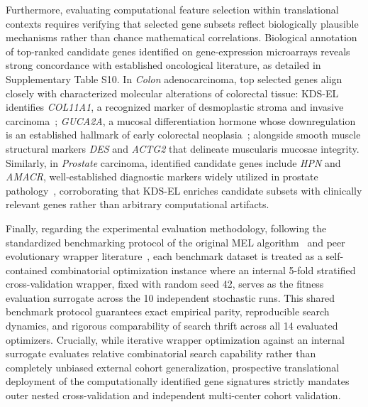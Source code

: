 Furthermore, evaluating computational feature selection within translational contexts requires verifying that selected gene subsets reflect biologically plausible mechanisms rather than chance mathematical correlations. Biological annotation of top-ranked candidate genes identified on gene-expression microarrays reveals strong concordance with established oncological literature, as detailed in Supplementary Table S10. In \textit{Colon} adenocarcinoma, top selected genes align closely with characterized molecular alterations of colorectal tissue: KDS-EL identifies \textit{COL11A1}, a recognized marker of desmoplastic stroma and invasive carcinoma~\cite{fischer2001}; \textit{GUCA2A}, a mucosal differentiation hormone whose downregulation is an established hallmark of early colorectal neoplasia~\cite{alon1999}; alongside smooth muscle structural markers \textit{DES} and \textit{ACTG2} that delineate muscularis mucosae integrity. Similarly, in \textit{Prostate} carcinoma, identified candidate genes include \textit{HPN} and \textit{AMACR}, well-established diagnostic markers widely utilized in prostate pathology~\cite{singh2002,rubin2002}, corroborating that KDS-EL enriches candidate subsets with clinically relevant genes rather than arbitrary computational artifacts.

Finally, regarding the experimental evaluation methodology, following the standardized benchmarking protocol of the original MEL algorithm~\cite{mel2024} and peer evolutionary wrapper literature~\cite{wangjia2022,wei2025}, each benchmark dataset is treated as a self-contained combinatorial optimization instance where an internal 5-fold stratified cross-validation wrapper, fixed with random seed 42, serves as the fitness evaluation surrogate across the 10 independent stochastic runs. This shared benchmark protocol guarantees exact empirical parity, reproducible search dynamics, and rigorous comparability of search thrift across all 14 evaluated optimizers. Crucially, while iterative wrapper optimization against an internal surrogate evaluates relative combinatorial search capability rather than completely unbiased external cohort generalization, prospective translational deployment of the computationally identified gene signatures strictly mandates outer nested cross-validation and independent multi-center cohort validation.


